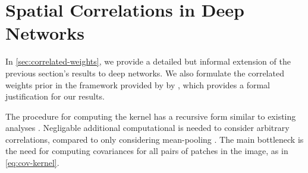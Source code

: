 \documentclass[tablecaption=bottom,wcp,nonatbib]{jmlr} %
\begin{document}




\section{Spatial Correlations in Deep Networks}
In \cref{sec:correlated-weights}, we provide a detailed but informal extension of the previous section's results to deep networks. We also formulate the correlated weights prior in the framework provided by by \citet{yang2019wide}, which provides a formal justification for our results.

The procedure for computing the kernel has a recursive form similar to existing analyses \citep{garriga2018infiniteconv,novak2019infiniteconv}. Negligable additional computational is needed to consider arbitrary correlations, compared to only considering mean-pooling \citep{novak2019infiniteconv,arora2019exact}. The main bottleneck is the need for computing covariances for all pairs of patches in the image, as in \cref{eq:cov-kernel}.
\end{document}
